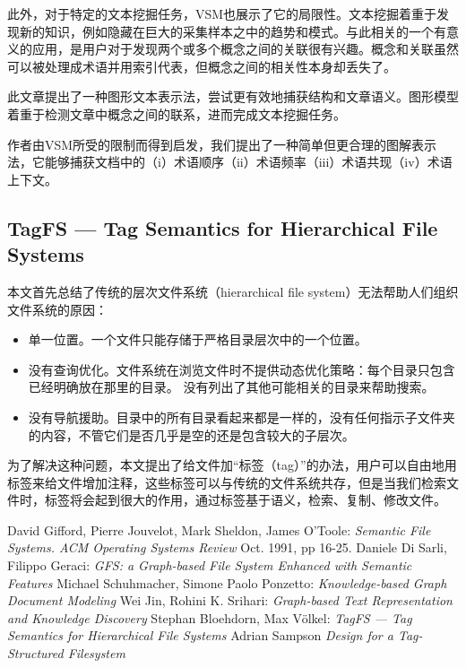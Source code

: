\documentclass[UTF8]{ctexart}
\begin{document}
此外，对于特定的文本挖掘任务，VSM也展示了它的局限性。文本挖掘着重于发现新的知识，例如隐藏在巨大的采集样本之中的趋势和模式。与此相关的一个有意义的应用，是用户对于发现两个或多个概念之间的关联很有兴趣。概念和关联虽然可以被处理成术语并用索引代表，但概念之间的相关性本身却丢失了。

此文章提出了一种图形文本表示法，尝试更有效地捕获结构和文章语义。图形模型着重于检测文章中概念之间的联系，进而完成文本挖掘任务。

作者由VSM所受的限制而得到启发，我们提出了一种简单但更合理的图解表示法，它能够捕获文档中的（i）术语顺序（ii）术语频率（iii）术语共现（iv）术语上下文。

\subsection{TagFS — Tag Semantics for Hierarchical File Systems}
本文首先总结了传统的层次文件系统（hierarchical file system）无法帮助人们组织文件系统的原因：
\begin{itemize}
  \item 单一位置。一个文件只能存储于严格目录层次中的一个位置。
  \item 没有查询优化。文件系统在浏览文件时不提供动态优化策略：每个目录只包含已经明确放在那里的目录。 没有列出了其他可能相关的目录来帮助搜索。
  \item 没有导航援助。目录中的所有目录看起来都是一样的，没有任何指示子文件夹的内容，不管它们是否几乎是空的还是包含较大的子层次。
\end{itemize}
为了解决这种问题，本文提出了给文件加“标签（tag）”的办法，用户可以自由地用标签来给文件增加注释，这些标签可以与传统的文件系统共存，但是当我们检索文件时，标签将会起到很大的作用，通过标签基于语义，检索、复制、修改文件。

\begin{thebibliography}{99}
David Gifford, Pierre Jouvelot, Mark Sheldon, James O’Toole: \emph{Semantic File Systems. ACM Operating Systems Review} Oct. 1991, pp 16-25.
Daniele Di Sarli, Filippo Geraci: \emph{GFS: a Graph-based File System Enhanced with Semantic Features}
Michael Schuhmacher, Simone Paolo Ponzetto: \emph{Knowledge-based Graph Document Modeling}
Wei Jin, Rohini K. Srihari: \emph{Graph-based Text Representation and Knowledge Discovery}
Stephan Bloehdorn, Max Völkel: \emph{TagFS — Tag Semantics for Hierarchical File Systems}
Adrian Sampson \emph{Design for a Tag-Structured Filesystem}
\end{thebibliography}
\end{document}
